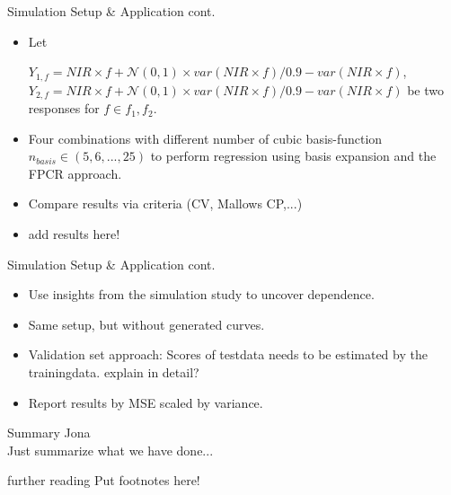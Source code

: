 \documentclass{beamer}
\begin{document}
	
	\begin{frame}{Simulation Setup \& Application cont.}
		\begin{itemize}
		\item
    		Let \\
    		 \vspace{0.1cm}
    		
    		$Y_{1,f} = NIR \times f + \mathcal{N}(0,1) \times var(NIR \times f)/0.9 - var(NIR \times f)$, \\
    		  $Y_{2,f} = NIR \times f + \mathcal{N}(0,1) \times var(NIR \times f)/0.9 - var(NIR \times f)$ be two responses for $f \in f_1, f_2$.		
    		 	\item
    		 	 Four combinations with different number of cubic basis-function $n_{basis} \in (5,6,...,25)$ to perform regression using basis expansion and the FPCR approach.
			\item Compare results via criteria (CV, Mallows CP,...)
			\item 
			{\color{green} add results here!}
			
    		
		\end{itemize}
	\end{frame}
	
	
	\begin{frame}{Simulation Setup \& Application cont.}
		\begin{itemize}
		\item
    		Use insights from the simulation study to uncover dependence.
    		\item
    		Same setup, but without generated curves.
    		\item
    		Validation set approach:	Scores of testdata needs to be estimated by the trainingdata.  {\color{green} explain in detail?}
    		\item
    		Report results by MSE scaled by variance.
		\end{itemize}
	\end{frame}
	
	

	\begin{frame}{Summary}
		Jona \\
		Just summarize what we have done...
	\end{frame}

	\begin{frame}{further reading}
		Put footnotes here!
	\end{frame}
	
\end{document}
